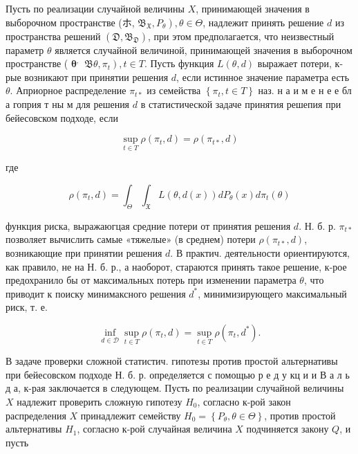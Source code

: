 \documentclass[10pt]{article}
\begin{document}
Пусть по реализации случайной величины $X$, принимающей значения в выборочном пространстве (ホ, $\left.\mathfrak{B}_{\mathfrak{X}}, P_{\theta}\right), \theta \in \Theta$, надлежит принять решение $d$ из пространства решений $\left(\mathfrak{D}, \mathfrak{B}_{\mathfrak{D}}\right)$, при этом предполагается, что неизвестный параметр $\theta$ является случайной величиной, принимающей значения в выборочном пространстве ( $\boldsymbol{\theta}^{\text {, }}$ $\left.\mathfrak{B} \theta, \pi_{t}\right), t \in T$. Пусть функция $L(\theta, d)$ выражает потери, к-рые возникают при принятии решения $d$, если истинное значение параметра есть $\theta$. Априорное распределение $\pi_{t *}$ из семейства $\left\{\pi_{t}, t \in T\right\}$ наз. н а и м е н е е бл а гоприя т ны м для решения $d$ в статистической задаче принятия решепия при бейесовском подходе, если



\[

\sup _{t \in T} \rho\left(\pi_{t}, d\right)=\rho\left(\pi_{t *}, d\right)

\]



где



\[

\rho\left(\pi_{t}, d\right)=\int_{\Theta} \int_{\mathfrak{X}} L(\theta, d(x)) d P_{\theta}(x) d \pi_{t}(\theta)

\]



функция риска, выражаюгцая средние потери от принятия решения $d$. Н. б. р. $\pi_{t *}$ позволяет вычислить самые «тяжелые» (в среднем) потери $\rho\left(\pi_{t *}, d\right)$, возникающие при принятии решения $d$. В практич. деятельности ориентируются, как правило, не на Н. б. р., а наоборот, стараются принять такое решение, к-рое предохранило бы от максимальных потерь при изменении параметра $\theta$, что приводит к поиску минимаксного решения $d^{*}$, минимизирующего максимальный риск, т. е.



\[

\inf _{d \in \mathscr{D}} \sup _{t \in T} \rho\left(\pi_{t}, d\right)=\sup _{t \in T} \rho\left(\pi_{t}, d^{*}\right) .

\]



В задаче проверки сложной статистич. гипотезы против простой альтернативы при бейесовском подходе Н. б. р. определяется с помощью р е д у кц и и В а л ь д а, к-рая заключается в следующем. Пусть по реализации случайной величины $X$ надлежит проверить сложную гипотезу $H_{0}$, согласно к-рой закон распределения $X$ принадлежит семейству $H_{0}=\left\{P_{\theta}, \theta \in \Theta\right\}$, против простой альтернативы $H_{1}$, согласно к-рой случайная величина $X$ подчиняется закону $Q$, и пусть
\end{document}
